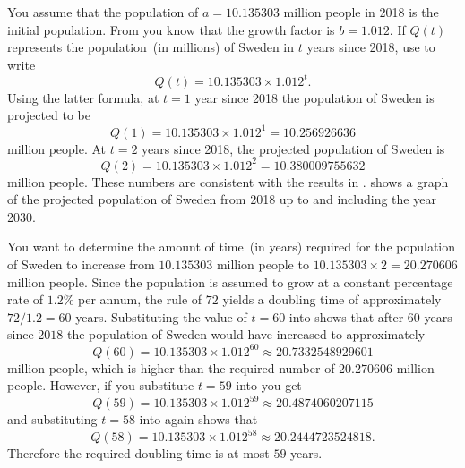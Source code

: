\documentclass[a4paper,oneside,12pt]{article}
\begin{document}
{\begin{solution}
You assume that the population of $a = 10.135303$ million people in
2018 is the initial population.
From  you
know that the growth factor is $b = 1.012$.  If $Q(t)$ represents the
population~(in millions) of Sweden in $t$ years since 2018, use
 to write
\begin{equation}
\label{eqn:exponential:Sweden_population_formula}
Q(t)
=
10.135303 \times 1.012^t.
\end{equation}
Using the latter formula, at $t = 1$ year since 2018 the population of
Sweden is projected to be
\[
Q(1)
=
10.135303 \times 1.012^1
=
10.256926636
\]
million people.  At $t = 2$ years since 2018, the projected population
of Sweden is
\[
Q(2)
=
10.135303 \times 1.012^2
=
10.380009755632
\]
million people.  These numbers are consistent with the results
in .
 shows a graph of the
projected population of Sweden from 2018 up to and including the year
2030.

You want to determine the amount of time~(in years) required for the
population of Sweden to increase from $10.135303$ million people to
$10.135303 \times 2 = 20.270606$ million people.  Since the population
is assumed to grow at a constant percentage rate of $1.2\%$ per annum,
the rule of $72$ yields a doubling time of approximately
$72 / 1.2 = 60$ years.  Substituting the value of $t = 60$ into
 shows that after
$60$ years since $2018$ the population of Sweden would have increased
to approximately
\[
Q(60)
=
10.135303 \times 1.012^{60}
\approx
20.7332548929601
\]
million people, which is higher than the required number of
$20.270606$ million people.  However, if you substitute $t = 59$ into
 you get
\[
Q(59)
=
10.135303 \times 1.012^{59}
\approx
20.4874060207115
\]
and substituting $t = 58$ into
 again shows that
\[
Q(58)
=
10.135303 \times 1.012^{58}
\approx
20.2444723524818.
\]
Therefore the required doubling time is at most $59$ years.
\end{solution}
}{}
\end{document}
